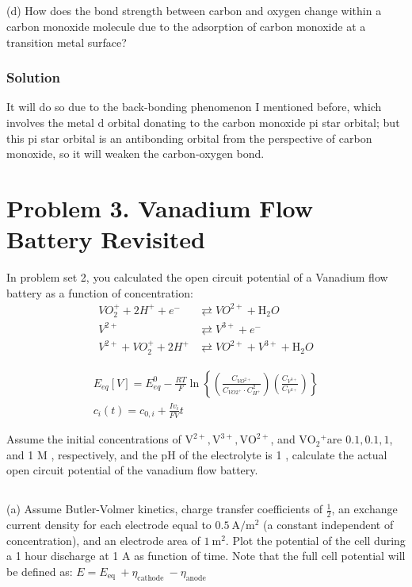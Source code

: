 \documentclass[12pt]{article}
\begin{document}
\subsection{}
(d) How does the bond strength between carbon and oxygen change within a carbon monoxide molecule due to the adsorption of carbon monoxide at a transition metal surface?

\subsubsection{Solution}
It will do so due to the back-bonding phenomenon I mentioned before, which involves the metal d orbital donating to the carbon monoxide pi star orbital; but this pi star orbital is an antibonding orbital from the perspective of carbon monoxide, so it will weaken the carbon-oxygen bond.

\section*{Problem 3. Vanadium Flow Battery Revisited}
In problem set 2, you calculated the open circuit potential of a Vanadium flow battery as a function of concentration:\\

$$
\begin{aligned}
V O_{2}^{+}+2 H^{+}+e^{-} & \rightleftarrows V O^{2+}+\mathrm{H}_{2} O \\
V^{2+} & \rightleftarrows V^{3+}+e^{-} \\
\hline V^{2+}+V O_{2}^{+}+2 H^{+} & \rightleftarrows V O^{2+}+V^{3+}+\mathrm{H}_{2} O
\end{aligned}
$$

$$
\begin{gathered}
E_{e q}[V]=E_{e q}^{0}-\frac{R T}{F} \ln \left\{\left(\frac{C_{V O^{2+}}}{C_{V O 2^{+}} \cdot C_{H^{+}}^{2}}\right)\left(\frac{C_{V^{3+}}}{C_{V^{2+}}}\right)\right\} \\
c_{i}(t)=c_{0, i}+\frac{I v_{i}}{F V} t
\end{gathered}
$$

Assume the initial concentrations of $\mathrm{V}^{2+}, \mathrm{V}^{3+}, \mathrm{VO}^{2+}$, and $\mathrm{VO}_{2}{ }^{+}$are $0.1,0.1,1$, and 1 M , respectively, and the pH of the electrolyte is 1 , calculate the actual open circuit potential of the vanadium flow battery.\\
\subsection{}
(a) Assume Butler-Volmer kinetics, charge transfer coefficients of $\frac{1}{2}$, an exchange current density for each electrode equal to $0.5 \mathrm{~A} / \mathrm{m}^{2}$ (a constant independent of concentration), and an electrode area of $1 \mathrm{~m}^{2}$. Plot the potential of the cell during a 1 hour discharge at 1 A as function of time. Note that the full cell potential will be defined as: $E=E_{\text {eq }}+\eta_{\text {cathode }}-\eta_{\text {anode }}$\\
\end{document}
